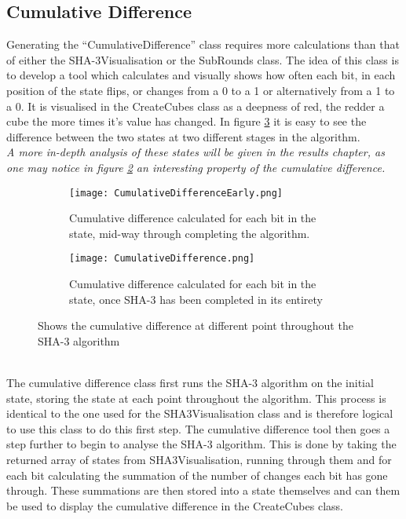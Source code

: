 \subsection{Cumulative Difference}
Generating the ``CumulativeDifference'' class requires more calculations than that of either the SHA-3Visualisation or the SubRounds class. The idea of this class is to develop a tool which calculates and visually shows how often each bit, in each position of the state flips, or changes from a 0 to a 1 or alternatively from a 1 to a 0. It is visualised in the CreateCubes class as a deepness of red, the redder a cube the more times it's value has changed. In figure \ref{fig:CumulativeDifference} it is easy to see the difference between the two states at two different stages in the algorithm.
\vspace{5mm}\\
\textit{A more in-depth analysis of these states will be given in the results chapter, as one may notice in figure \ref{fig:CompleteCD} an interesting property of the cumulative difference.}
\begin{figure}[h!]
\advance\leftskip-2cm
\begin{subfigure}{.6\textwidth}
\texttt{[image: CumulativeDifferenceEarly.png]}
    \caption{Cumulative difference calculated for each bit in the state, mid-way through completing the algorithm.}
    \label{fig:HalfWayCD}
\end{subfigure}
\advance\rightskip-2cm
\hfill\begin{subfigure}{.6\textwidth}
\texttt{[image: CumulativeDifference.png]}
    \caption{Cumulative difference calculated for each bit in the state, once SHA-3 has been completed in its entirety }
    \label{fig:CompleteCD}
\end{subfigure}
\caption{Shows the cumulative difference at different point throughout the SHA-3 algorithm}
\label{fig:CumulativeDifference}
\end{figure}
\vspace{20mm}\\
The cumulative difference class first runs the SHA-3 algorithm on the initial state, storing the state at each point throughout the algorithm. This process is identical to the one used for the SHA3Visualisation class and is therefore logical to use this class to do this first step. The cumulative difference tool then goes a step further to begin to analyse the SHA-3 algorithm. This is done by taking the returned array of states from SHA3Visualisation, running through them and for each bit calculating the summation of the number of changes each bit has gone through. These summations are then stored into a state themselves and can them be used to display the cumulative difference in the CreateCubes class.
